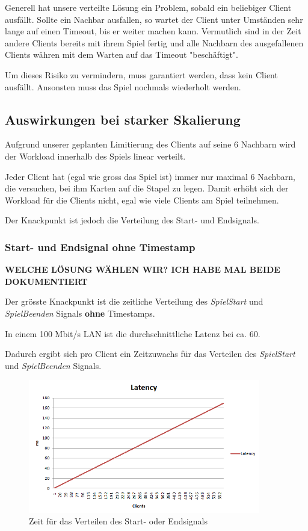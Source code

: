 Generell hat unsere verteilte Lösung ein Problem, sobald ein beliebiger Client ausfällt. Sollte ein Nachbar ausfallen, so wartet der Client unter Umständen sehr lange auf einen Timeout, bis er weiter machen kann. Vermutlich sind in der Zeit andere Clients bereits mit ihrem Spiel fertig und alle Nachbarn des ausgefallenen Clients währen mit dem Warten auf das Timeout "beschäftigt".

Um dieses Risiko zu vermindern, muss garantiert werden, dass kein Client ausfällt. Ansonsten muss das Spiel nochmals wiederholt werden.



\subsection{Auswirkungen bei starker Skalierung}

Aufgrund unserer geplanten Limitierung des Clients auf seine 6 Nachbarn wird der Workload innerhalb des Spiels linear verteilt. 

Jeder Client hat (egal wie gross das Spiel ist) immer nur maximal 6 Nachbarn, die versuchen, bei ihm Karten auf die Stapel zu legen. Damit erhöht sich der Workload für die Clients nicht, egal wie viele Clients am Spiel teilnehmen.

Der Knackpunkt ist jedoch die Verteilung des Start- und Endsignals.


\subsubsection{Start- und Endsignal ohne Timestamp}

\color{red}
\textbf{WELCHE LÖSUNG WÄHLEN WIR? ICH HABE MAL BEIDE DOKUMENTIERT}
\color{black}

Der grösste Knackpunkt ist die zeitliche Verteilung des \textit{SpielStart} und \textit{SpielBeenden} Signals \textbf{ohne} Timestamps.

In einem 100 Mbit/s LAN  ist die durchschnittliche Latenz bei ca. \unit{60}{\micro\second}.

Dadurch ergibt sich pro Client ein Zeitzuwachs für das Verteilen des \textit{SpielStart} und \textit{SpielBeenden} Signals.

\begin{figure}[hbt]
  \centering
  \includegraphics[width=0.9\textwidth,angle=0]{graphics/latency.png}
  \caption{Zeit für das Verteilen des Start- oder Endsignals \hfill{} }
  \label{ergebnislatency}
 \end{figure}
 
